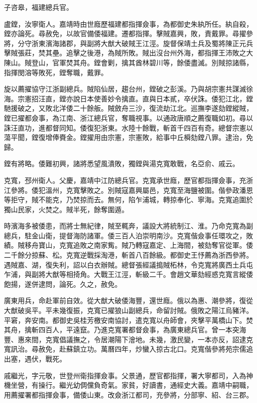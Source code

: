 \begin{pinyinscope}
子咨皋，福建總兵官。

盧鏜，汝寧衛人。嘉靖時由世廕歷福建都指揮僉事，為都御史朱紈所任。紈自殺，鏜亦論死。尋赦免，以故官備倭福建。遷都指揮。擊賊嘉興，敗，責戴罪。尋擢參將，分守浙東濱海諸郡，與副將大猷大破賊王江涇。旋督保靖土兵及蜀將陳正元兵擊賊張莊，焚其壘。追擊之後港，為賊所敗。賊出沒台州外海，都指揮王沛敗之大陳山。賊登山，官軍焚其舟。鏜會剿，擒其酋林碧川等，餘倭盡滅。別賊掠諸縣，指揮閔溶等敗死，鏜奪職，戴罪。

旋以薦擢協守江浙副總兵。賊陷仙居，趨台州，鏜破之彭溪。乃與胡宗憲共謀滅徐海。宗憲招汪直，鏜亦說日本使善妙令擒直。直與日本貳，卒伏誅。倭犯江北，鏜馳援破之，又敗北洋倭二十餘舨。賊斂舟三沙，復流劫江北。巡撫李遂劾鏜縱賊，鏜已擢都僉事，為江南、浙江總兵官，奪職視事。以通政唐順之薦復職如初。尋以誅汪直功，進都督同知。倭復犯浙東。水陸十餘戰，斬首千四百有奇。總督宗憲以蕩平聞，鏜復增俸賚金。鏜擢用由宗憲，宗憲敗，給事中丘橓劾鏜八罪。逮治，免歸。

鏜有將略。倭難初興，諸將悉望風潰敗，獨鏜與湯克寬敢戰，名亞俞、戚云。

克寬，邳州衛人。父慶，嘉靖中江防總兵官。克寬承世廕，歷官都指揮僉事，充浙江參將。倭犯溫州，克寬擊敗之。別賊寇嘉興屬邑，克寬至海鹽被圍。偕參政潘恩等拒守，賊不能克，乃焚掠而去。無何，陷乍浦城，轉掠奉化、寧海。克寬追圍於獨山民家，火焚之。賊半死，餘奪圍遁。

時濱海多被倭患，而將士無紀律，賊至輒奔，議設大將統制江、淮。乃命克寬為副總兵，駐金山衛，提督海防諸軍。倭三百人泊崇明南沙。克寬偕僉事任環攻之，敗績。賊移舟寶山，克寬追敗之南家觜。賊乃轉寇嘉定、上海間，被劾奪官從軍。倭二千餘分掠蘇、松。克寬逆戰採淘港，斬首八百餘級。都御史王忬薦為浙西參將。遇賊嘉、湖，復失利，詔以白衣辦賊。總督張經議搗賊柘林，令克寬將廣西土兵屯乍浦，與副將大猷等相掎角。大戰王江涇，斬級二千。會趙文華劾經惑克寬言縱倭飽揚，遂併逮問，論死。久之，赦免。

廣東用兵，命赴軍前自效。從大猷大破倭海豐，還世廕。俄以為惠、潮參將，復從大猷破吳平。平未幾復振，克寬已擢狼山副總兵，命留討賊。俄敗之陽江烏豬洋。平窘，奔安南。都御史吳桂芳檄安南協討，遣克寬以舟師會，夾擊平萬橋山下。焚其舟，擒斬四百人，平遠竄。乃進克寬署都督僉事，為廣東總兵官。曾一本突海豐、惠來間，克寬倡議撫之，令居潮陽下澮地。未幾，激民變，一本亦反，詔逮克寬訊治。尋赦免，赴蘇鎮立功。萬曆四年，炒蠻入掠古北口。克寬偕參將苑宗儒追出塞，遇伏，戰死。

戚繼光，字元敬，世登州衛指揮僉事。父景通，歷官都指揮，署大寧都司，入為神機坐營，有操行。繼光幼倜儻負奇氣。家貧，好讀書，通經史大義。嘉靖中嗣職，用薦擢署都指揮僉事，備倭山東。改僉浙江都司，充參將，分部寧、紹、台三郡。


\end{pinyinscope}
